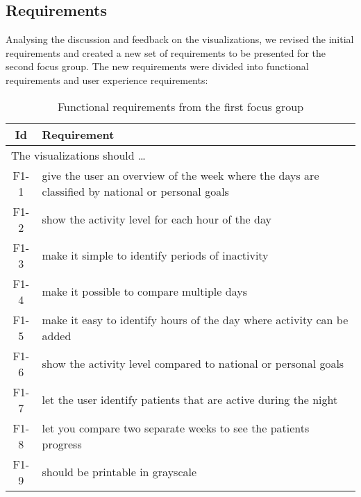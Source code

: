 \subsection{Requirements}
Analysing the discussion and feedback on the visualizations, we revised the initial requirements and created a new set of requirements to be presented for the second focus group. The new requirements were divided into functional requirements and user experience requirements:

\begin{table}[h!]
  \begin{center}
  \begin{tabular}{|c|p{12cm}|}
    \hline
      \textbf{Id} & \textbf{Requirement} \\ \hline
    \multicolumn{2}{|l|}{The visualizations should \ldots} \\ \hline
      F1-1 & give the user an overview of the week where the days are classified by national or personal goals \\ \hline
      F1-2 & show the activity level for each hour of the day \\ \hline
      F1-3 & make it simple to identify periods of inactivity \\ \hline
      F1-4 & make it possible to compare multiple days \\ \hline
      F1-5 & make it easy to identify hours of the day where activity can be added \\ \hline
      F1-6 & show the activity level compared to national or personal goals \\ \hline
      F1-7 & let the user identify patients that are active during the night \\ \hline
      F1-8 & let you compare two separate weeks to see the patients progress \\ \hline
      F1-9 & should be printable in grayscale \\ \hline
  \end{tabular}
  \end{center}
  \caption{Functional requirements from the first focus group}
\end{table}

